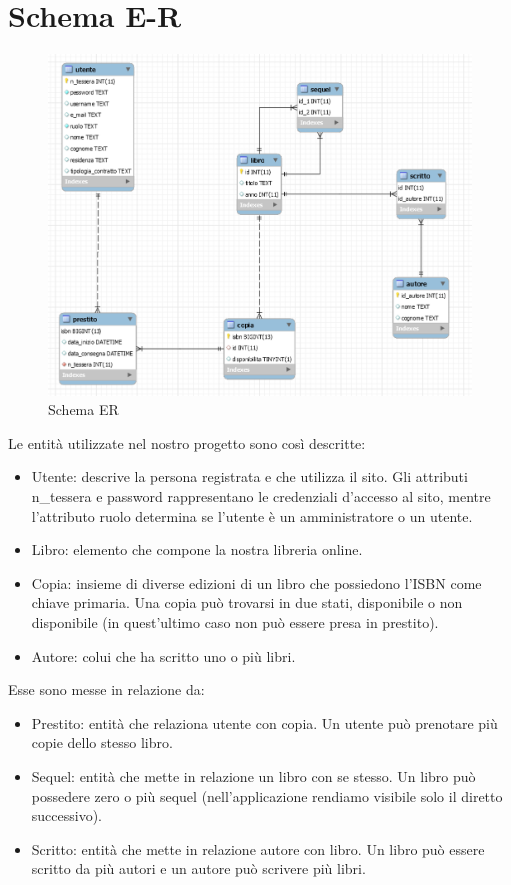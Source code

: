 \documentclass[a4paper,10pt]{article}
\begin{document}
\section*{Schema E-R}

\begin{figure}[H]
	\centering
	\includegraphics[width=0.9\linewidth]{images/ERdiagram}
	\caption[Schema ER]{Schema ER}
	\label{fig:re}
\end{figure}

Le entità utilizzate nel nostro progetto sono così descritte:

\begin{itemize}
	\item Utente: descrive la persona registrata e che utilizza il sito. Gli attributi n\_tessera e password rappresentano le credenziali d'accesso al sito, mentre l'attributo ruolo determina se l'utente è un amministratore o un utente.
	\item Libro: elemento che compone la nostra libreria online.
	\item Copia: insieme di diverse edizioni di un libro che possiedono l'ISBN come chiave primaria. Una copia può trovarsi in due stati, disponibile o non disponibile (in quest'ultimo caso non può essere presa in prestito).
	\item Autore: colui che ha scritto uno o più libri.
\end{itemize}

Esse sono messe in relazione da:
\begin{itemize}
	\item Prestito: entità che relaziona utente con copia. Un utente può prenotare più copie dello stesso libro.
	\item Sequel: entità che mette in relazione un libro con se stesso. Un libro può possedere zero o più sequel (nell'applicazione rendiamo visibile solo il diretto successivo).
	\item Scritto: entità che mette in relazione autore con libro. Un libro può essere scritto da più autori e un autore può scrivere più libri.
\end{itemize}
\end{document}
